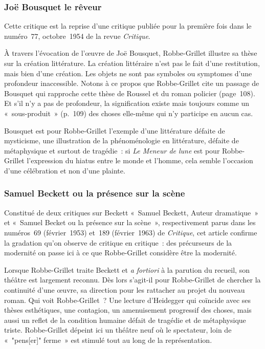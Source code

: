 \documentclass[12pt, a4paper]{article}
\begin{document}
\subsubsection{Joë Bousquet le rêveur}
			Cette critique est la reprise d'une critique publiée pour la première fois dans le numéro~77, octobre~1954 de la revue \textit{Critique}.

À travers l'évocation de l'œuvre de Joë Bousquet, Robbe-Grillet illustre sa thèse sur la création littérature. La création littéraire n'est pas le fait d'une restitution, mais bien d'une création. Les objets ne sont pas symboles ou symptomes d'une profondeur inaccessible. Notons à ce propos que Robbe-Grillet cite un passage de Bousquet qui rapproche cette thèse de Roussel et du roman policier (page~108). Et s'il n'y a pas de profondeur, la signification existe mais toujours comme un «~sous-produit~» (p.~109) des choses elle-même qui n'y participe en aucun cas.

Bousquet est pour Robbe-Grillet l'exemple d'une littérature défaite de mysticisme, une illustration de la phénoménologie en littérature, défaite de métaphysique et surtout de tragédie~: si \textit{Le Meneur de lune} est pour Robbe-Grillet l'expression du hiatus entre le monde et l'homme, cela semble l'occasion d'une célébration et non d'une plainte.


\subsubsection{Samuel Beckett ou la présence sur la scène}
			Constitué de deux critiques sur Beckett «~Samuel Beckett, Auteur dramatique~» et «~Samuel Becket ou la présence sur la scène~», respectivement parus dans les numéros~69 (février~1953) et~189 (février~1963) de \textit{Critique}, cet article confirme la gradation qu'on observe de critique en critique~: des précurseurs de la modernité on passe ici à ce que Robbe-Grillet considère être la modernité.

Lorsque Robbe-Grillet traite Beckett et \textit{a fortiori} à la parution du recueil, son théâtre est largement reconnu. Dès lors s'agit-il pour Robbe-Grillet de chercher la continuité d'une œuvre, sa direction pour les rattacher au projet du nouveau roman. Qui voit Robbe-Grillet~? Une lecture d'Heidegger qui coïncide avec ses thèses esthétiques, une contagion, un amenuisement progressif des choses, mais aussi un reflet de la condition humaine défait de tragédie et de métaphysique triste. Robbe-Grillet dépeint ici un théâtre neuf où le spectateur, loin de «~"pens[er]" ferme~» est stimulé tout au long de la représentation.
\end{document}
